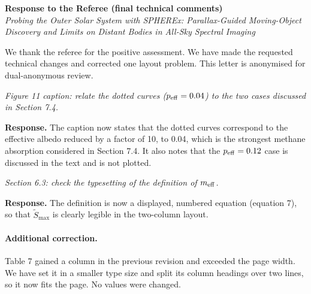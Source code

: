 \documentclass[11pt]{article}
\newenvironment{referee}{\par\color{black!60}\itshape}{\par}
\newcommand{\resp}{\par\noindent\textbf{Response.} }
\begin{document}
\begin{center}
{\large\bfseries Response to the Referee (final technical comments)}\\[4pt]
\emph{Probing the Outer Solar System with SPHEREx: Parallax-Guided Moving-Object Discovery and Limits on Distant Bodies in All-Sky Spectral Imaging}
\end{center}

We thank the referee for the positive assessment. We have made the requested technical changes and corrected one layout problem. This letter is anonymised for dual-anonymous review.

\begin{referee}
Figure 11 caption: relate the dotted curves ($p_{\rm eff} = 0.04$) to the two cases discussed in Section 7.4.
\end{referee}
\resp The caption now states that the dotted curves correspond to the effective albedo reduced by a factor of 10, to 0.04, which is the strongest methane absorption considered in Section 7.4. It also notes that the $p_{\rm eff} = 0.12$ case is discussed in the text and is not plotted.

\begin{referee}
Section 6.3: check the typesetting of the definition of $m_{\rm eff}$.
\end{referee}
\resp The definition is now a displayed, numbered equation (equation 7), so that $\widetilde{S}_{\max}$ is clearly legible in the two-column layout.

\paragraph{Additional correction.} Table 7 gained a column in the previous revision and exceeded the page width. We have set it in a smaller type size and split its column headings over two lines, so it now fits the page. No values were changed.
\end{document}
